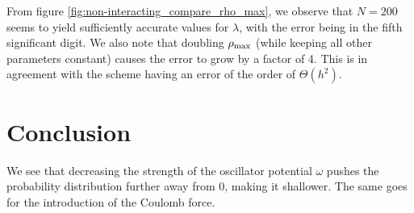 \documentclass[a4paper]{article}
\begin{document}
From figure \ref{fig:non-interacting_compare_rho_max}, we observe that $N=200$ seems to yield sufficiently accurate values for $\lambda$, with the error being in the fifth significant digit. We also note that doubling ${\rho_{\mathrm{max}}}$ (while keeping all other parameters constant) causes the error to grow by a factor of 4. This is in agreement with the scheme having an error of the order of $\Theta(h^2)$.

\section{Conclusion}\label{sec:conclusion}
We see that decreasing the strength of the oscillator potential $\omega$ pushes the probability distribution further away from 0, making it shallower. The same goes for the introduction of the Coulomb force.


%
%

{}
\end{document}
